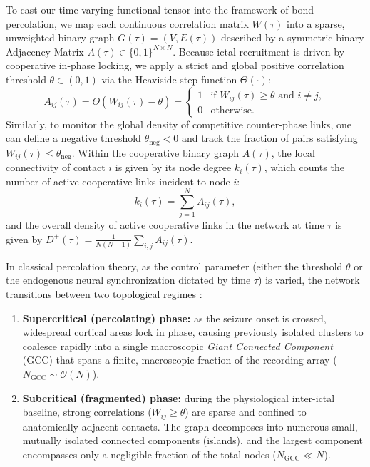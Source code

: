 To cast our time-varying functional tensor into the framework of bond percolation, we map each continuous correlation matrix $W(\tau)$ into a sparse, unweighted binary graph $G(\tau) = (V, E(\tau))$ described by a symmetric binary Adjacency Matrix $A(\tau) \in \{0, 1\}^{N \times N}$. Because ictal recruitment is driven by cooperative in-phase locking, we apply a strict and global positive correlation threshold $\theta \in (0, 1)$ via the Heaviside step function $\Theta(\cdot)$:
\begin{equation}
    A_{ij}(\tau) = \Theta\!\left(W_{ij}(\tau) - \theta\right) =
    \begin{cases}
        1 & \text{if } W_{ij}(\tau) \geq \theta \text{ and } i \neq j, \\
        0 & \text{otherwise}.
    \end{cases}
    \label{eq:binarization}
\end{equation}
Similarly, to monitor the global density of competitive counter-phase links, one can define a negative threshold $\theta_{\text{neg}} < 0$ and track the fraction of pairs satisfying $W_{ij}(\tau) \leq \theta_{\text{neg}}$. Within the cooperative binary graph $A(\tau)$, the local connectivity of contact $i$ is given by its node degree $k_i(\tau)$, which counts the number of active cooperative links incident to node $i$:
\begin{equation}
    k_i(\tau) = \sum_{j=1}^{N} A_{ij}(\tau),
    \label{eq:degree}
\end{equation}
and the overall density of active cooperative links in the network at time $\tau$ is given by $D^{+}(\tau) = \frac{1}{N(N-1)} \sum_{i,j} A_{ij}(\tau)$.

In classical percolation theory, as the control parameter (either the threshold $\theta$ or the endogenous neural synchronization dictated by time $\tau$) is varied, the network transitions between two topological regimes \cite{newman2018networks, kramer2010coalescence}:
\begin{enumerate}
    \item \textbf{Supercritical (percolating) phase:} as the seizure onset is crossed, widespread cortical areas lock in phase, causing previously isolated clusters to coalesce rapidly into a single macroscopic \textit{Giant Connected Component} (GCC) that spans a finite, macroscopic fraction of the recording array ($N_{\text{GCC}} \sim \mathcal{O}(N)$).
    \item \textbf{Subcritical (fragmented) phase:} during the physiological inter-ictal baseline, strong correlations ($W_{ij} \geq \theta$) are sparse and confined to anatomically adjacent contacts. The graph decomposes into numerous small, mutually isolated connected components (islands), and the largest component encompasses only a negligible fraction of the total nodes ($N_{\text{GCC}} \ll N$).
\end{enumerate}

